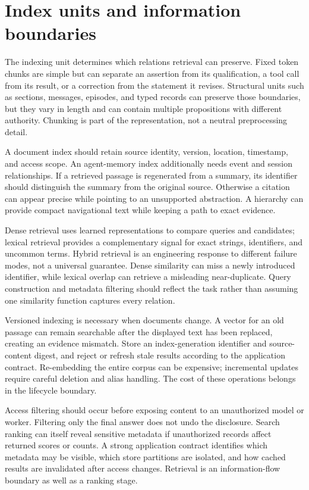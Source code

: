 \section{Index units and information boundaries}\label{sec:C16:index}
The indexing unit determines which relations retrieval can preserve. Fixed token chunks are simple but can separate an assertion from its qualification, a tool call from its result, or a correction from the statement it revises. Structural units such as sections, messages, episodes, and typed records can preserve those boundaries, but they vary in length and can contain multiple propositions with different authority. Chunking is part of the representation, not a neutral preprocessing detail.

A document index should retain source identity, version, location, timestamp, and access scope. An agent-memory index additionally needs event and session relationships. If a retrieved passage is regenerated from a summary, its identifier should distinguish the summary from the original source. Otherwise a citation can appear precise while pointing to an unsupported abstraction. A hierarchy can provide compact navigational text while keeping a path to exact evidence.

Dense retrieval uses learned representations to compare queries and candidates; lexical retrieval provides a complementary signal for exact strings, identifiers, and uncommon terms. Hybrid retrieval is an engineering response to different failure modes, not a universal guarantee. Dense similarity can miss a newly introduced identifier, while lexical overlap can retrieve a misleading near-duplicate. Query construction and metadata filtering should reflect the task rather than assuming one similarity function captures every relation.

Versioned indexing is necessary when documents change. A vector for an old passage can remain searchable after the displayed text has been replaced, creating an evidence mismatch. Store an index-generation identifier and source-content digest, and reject or refresh stale results according to the application contract. Re-embedding the entire corpus can be expensive; incremental updates require careful deletion and alias handling. The cost of these operations belongs in the lifecycle boundary.

Access filtering should occur before exposing content to an unauthorized model or worker. Filtering only the final answer does not undo the disclosure. Search ranking can itself reveal sensitive metadata if unauthorized records affect returned scores or counts. A strong application contract identifies which metadata may be visible, which store partitions are isolated, and how cached results are invalidated after access changes. Retrieval is an information-flow boundary as well as a ranking stage.

